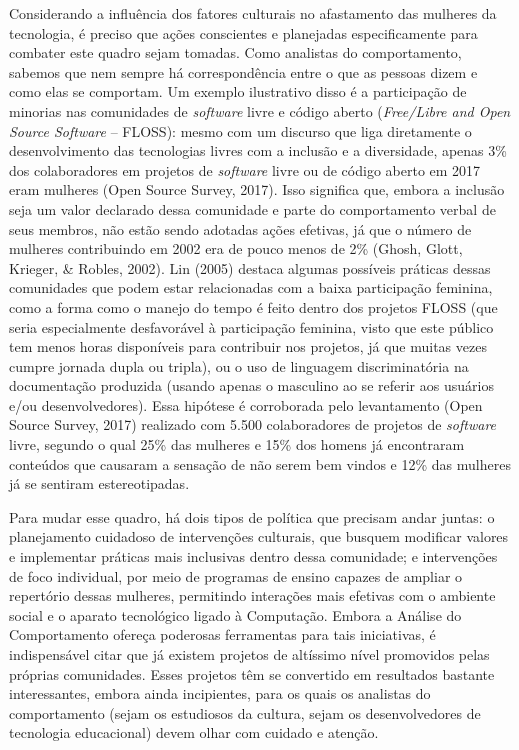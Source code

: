 Considerando a influência dos fatores culturais no afastamento das mulheres da tecnologia, é preciso que ações conscientes e planejadas especificamente para combater este quadro sejam tomadas. Como analistas do comportamento, sabemos que nem sempre há correspondência entre o que as pessoas dizem e como elas se comportam. Um exemplo ilustrativo disso é a participação de minorias nas comunidades de \textit{software} livre e código aberto (\textit{Free/Libre and Open Source Software} – FLOSS): mesmo com um discurso que liga diretamente o desenvolvimento das tecnologias livres com a inclusão e a diversidade, apenas 3\% dos colaboradores em projetos de \textit{software} livre ou de código aberto em 2017 eram mulheres (Open Source Survey, 2017). Isso significa que, embora a inclusão seja um valor declarado dessa comunidade e parte do comportamento verbal de seus membros, não estão sendo adotadas ações efetivas, já que o número de mulheres contribuindo em 2002 era de pouco menos de 2\% (Ghosh, Glott, Krieger, \& Robles, 2002). Lin (2005) destaca algumas possíveis práticas dessas comunidades que podem estar relacionadas com a baixa participação feminina, como a forma como o manejo do tempo é feito dentro dos projetos FLOSS (que seria especialmente desfavorável à participação feminina, visto que este público tem menos horas disponíveis para contribuir nos projetos, já que muitas vezes cumpre jornada dupla ou tripla), ou o uso de linguagem discriminatória na documentação produzida (usando apenas o masculino ao se referir aos usuários e/ou desenvolvedores). Essa hipótese é corroborada pelo levantamento (Open Source Survey, 2017) realizado com 5.500 colaboradores de projetos de \textit{software} livre, segundo o qual 25\% das mulheres e 15\% dos homens já encontraram conteúdos que causaram a sensação de não serem bem vindos e 12\% das mulheres já se sentiram estereotipadas. 

Para mudar esse quadro, há dois tipos de política que precisam andar juntas: o planejamento cuidadoso de intervenções culturais, que busquem modificar valores e implementar práticas mais inclusivas dentro dessa comunidade; e intervenções de foco individual, por meio de programas de ensino capazes de ampliar o repertório dessas mulheres, permitindo interações mais efetivas com o ambiente social e o aparato tecnológico ligado à Computação. Embora a Análise do Comportamento ofereça poderosas ferramentas para tais iniciativas, é indispensável citar que já existem projetos de altíssimo nível promovidos pelas próprias comunidades. Esses projetos têm se convertido em resultados bastante interessantes, embora ainda incipientes, para os quais os analistas do comportamento (sejam os estudiosos da cultura, sejam os desenvolvedores de tecnologia educacional) devem olhar com cuidado e atenção.

